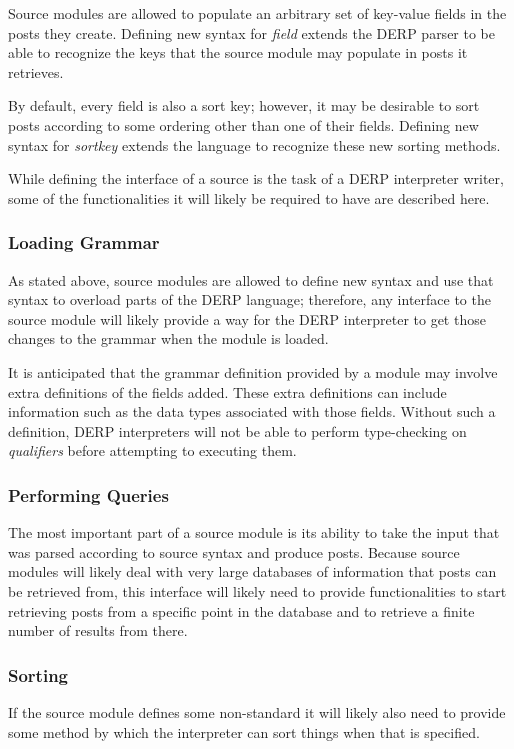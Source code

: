 Source modules are allowed to populate an arbitrary set of key-value fields in the posts 
they create. Defining new syntax for \textit{field} extends the DERP parser to be able to recognize 
the keys that the source module may populate in posts it retrieves.

By default, every field is also a sort key; however, it may be desirable to sort posts according 
to some ordering other than one of their fields. Defining new syntax for \textit{sortkey} extends the 
language to recognize these new sorting methods.

While defining the interface of a source is the task of a DERP interpreter writer, some of the 
functionalities it will likely be required to have are described here.

\subsubsection{Loading Grammar}
As stated above, source modules are allowed to define new syntax and use that syntax to overload parts 
of the DERP language; therefore, any interface to the source module will likely provide a way for the 
DERP interpreter to get those changes to the grammar when the module is loaded.

It is anticipated that the grammar definition provided by a module may involve extra definitions of 
the fields added. These extra definitions can include information such as the data types associated 
with those fields. Without such a definition, DERP interpreters will not be able to perform type-checking 
on \textit{qualifiers} before attempting to executing them.

\subsubsection{Performing Queries}
The most important part of a source module is its ability to take the input that was parsed according to 
source syntax and produce posts. Because source modules will likely deal with very large databases of 
information that posts can be retrieved from, this interface will likely need to provide functionalities 
to start retrieving posts from a specific point in the database and to retrieve a finite number of results 
from there.


\subsubsection{Sorting}
If the source module defines some non-standard  it will likely also need to provide some method by 
which the interpreter can sort things when that  is specified.

